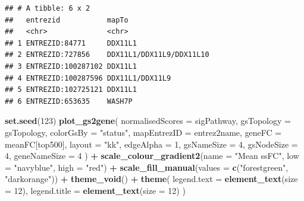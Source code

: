 \documentclass[9pt,a4paper,]{extarticle}
\newenvironment{Shaded}{\begin{snugshade}}{\end{snugshade}}
\newcommand{\AttributeTok}[1]{\textcolor[rgb]{0.13,0.29,0.53}{#1}}
\newcommand{\DecValTok}[1]{\textcolor[rgb]{0.00,0.00,0.81}{#1}}
\newcommand{\FunctionTok}[1]{\textcolor[rgb]{0.13,0.29,0.53}{\textbf{#1}}}
\newcommand{\NormalTok}[1]{#1}
\newcommand{\SpecialCharTok}[1]{\textcolor[rgb]{0.81,0.36,0.00}{\textbf{#1}}}
\newcommand{\StringTok}[1]{\textcolor[rgb]{0.31,0.60,0.02}{#1}}
\begin{document}
\begin{verbatim}
## # A tibble: 6 x 2
##   entrezid           mapTo                   
##   <chr>              <chr>                   
## 1 ENTREZID:84771     DDX11L1                 
## 2 ENTREZID:727856    DDX11L1/DDX11L9/DDX11L10
## 3 ENTREZID:100287102 DDX11L1                 
## 4 ENTREZID:100287596 DDX11L1/DDX11L9         
## 5 ENTREZID:102725121 DDX11L1                 
## 6 ENTREZID:653635    WASH7P
\end{verbatim}

\begin{Shaded}
\begin{Highlighting}[]
\FunctionTok{set.seed}\NormalTok{(}\DecValTok{123}\NormalTok{)}
\FunctionTok{plot\_gs2gene}\NormalTok{(}
  \AttributeTok{normalisedScores =}\NormalTok{ sigPathway, }
  \AttributeTok{gsTopology =}\NormalTok{ gsTopology, }
  \AttributeTok{colorGsBy =} \StringTok{"status"}\NormalTok{, }
  \AttributeTok{mapEntrezID =}\NormalTok{ entrez2name, }
  \AttributeTok{geneFC =}\NormalTok{ meanFC[top500], }
  \AttributeTok{layout =} \StringTok{"kk"}\NormalTok{,}
  \AttributeTok{edgeAlpha =} \DecValTok{1}\NormalTok{, }
  \AttributeTok{gsNameSize =} \DecValTok{4}\NormalTok{, }
  \AttributeTok{gsNodeSize =} \DecValTok{4}\NormalTok{,}
  \AttributeTok{geneNameSize =} \DecValTok{4}
\NormalTok{) }\SpecialCharTok{+}
  \FunctionTok{scale\_colour\_gradient2}\NormalTok{(}\AttributeTok{name =} \StringTok{"Mean ssFC"}\NormalTok{, }\AttributeTok{low =} \StringTok{"navyblue"}\NormalTok{, }\AttributeTok{high =} \StringTok{"red"}\NormalTok{) }\SpecialCharTok{+}
  \FunctionTok{scale\_fill\_manual}\NormalTok{(}\AttributeTok{values =} \FunctionTok{c}\NormalTok{(}\StringTok{"forestgreen"}\NormalTok{, }\StringTok{"darkorange"}\NormalTok{)) }\SpecialCharTok{+}
  \FunctionTok{theme\_void}\NormalTok{() }\SpecialCharTok{+}
  \FunctionTok{theme}\NormalTok{(}
    \AttributeTok{legend.text =} \FunctionTok{element\_text}\NormalTok{(}\AttributeTok{size =} \DecValTok{12}\NormalTok{),}
    \AttributeTok{legend.title =} \FunctionTok{element\_text}\NormalTok{(}\AttributeTok{size =} \DecValTok{12}\NormalTok{)}
\NormalTok{  )}
\end{Highlighting}
\end{Shaded}
\end{document}
